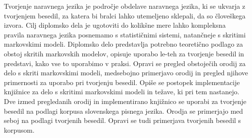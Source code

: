 Tvorjenje naravnega jezika je področje obdelave naravnega jezika, ki se ukvarja z tvorjenjem besedil, za katera bi bralci lahko utemeljeno sklepali, da so človeškega izvora. Cilj diplomsko dela je ugotoviti do kolikšne mere lahko kompleksna pravila naravnega jezika posnemamo s statističnimi sistemi, natančneje s skritimi markovskimi modeli. Diplomsko delo predstavlja potrebno teoretično podlago za obstoj skritih markovskih modelov, opisuje uporabo le-teh za tvorjenje besedil in predstavi, kako vse to uporabimo v praksi. Opravi se pregled obstoječih orodij za delo s skriti markovskimi modeli, medsebojno primerjavo orodij in pregled njihove primernosti za uporabo pri tvorjenju besedil. Opiše se postopek implementacije knjižnice za delo s skritimi markovskimi modeli in težave, ki pri tem nastanejo. Dve izmed pregledanih orodij in implementirano knjižnico se uporabi za tvorjenje besedil na podlagi korpusa slovenskega pisnega jezika. Orodja se primerjajo med seboj na podlagi tvorjenih besedil. Opravi se tudi primerjava tvorjenih besedil s korpusom.
